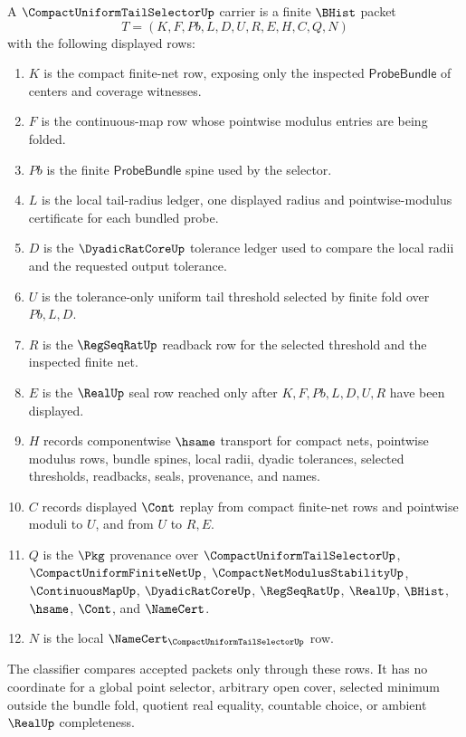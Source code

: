 \begin{definition}
\label{def:compact-uniform-tail-selector-carrier}
A $\CompactUniformTailSelectorUp$ carrier is a finite $\BHist$ packet
$$
T=(K,F,Pb,L,D,U,R,E,H,C,Q,N)
$$
with the following displayed rows:
\begin{enumerate}
\item $K$ is the compact finite-net row, exposing only the inspected $\mathsf{ProbeBundle}$ of centers and coverage witnesses.
\item $F$ is the continuous-map row whose pointwise modulus entries are being folded.
\item $Pb$ is the finite $\mathsf{ProbeBundle}$ spine used by the selector.
\item $L$ is the local tail-radius ledger, one displayed radius and pointwise-modulus certificate for each bundled probe.
\item $D$ is the $\DyadicRatCoreUp$ tolerance ledger used to compare the local radii and the requested output tolerance.
\item $U$ is the tolerance-only uniform tail threshold selected by finite fold over $Pb,L,D$.
\item $R$ is the $\RegSeqRatUp$ readback row for the selected threshold and the inspected finite net.
\item $E$ is the $\RealUp$ seal row reached only after $K,F,Pb,L,D,U,R$ have been displayed.
\item $H$ records componentwise $\hsame$ transport for compact nets, pointwise modulus rows, bundle spines, local radii, dyadic tolerances, selected thresholds, readbacks, seals, provenance, and names.
\item $C$ records displayed $\Cont$ replay from compact finite-net rows and pointwise moduli to $U$, and from $U$ to $R,E$.
\item $Q$ is the $\Pkg$ provenance over $\CompactUniformTailSelectorUp$, $\CompactUniformFiniteNetUp$, $\CompactNetModulusStabilityUp$, $\ContinuousMapUp$, $\DyadicRatCoreUp$, $\RegSeqRatUp$, $\RealUp$, $\BHist$, $\hsame$, $\Cont$, and $\NameCert$.
\item $N$ is the local $\NameCert_{\CompactUniformTailSelectorUp}$ row.
\end{enumerate}
The classifier compares accepted packets only through these rows. It has no coordinate for a global point selector, arbitrary open cover, selected minimum outside the bundle fold, quotient real equality, countable choice, or ambient $\RealUp$ completeness.
\end{definition}

